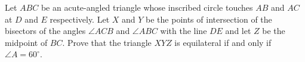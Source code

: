 Let $ABC$ be an acute-angled triangle whose inscribed circle touches $AB$ and $AC$ at $D$ and $E$ respectively. Let $X$ and $Y$ be the points of intersection of the bisectors of the angles $\angle ACB$ and $\angle ABC$ with the line $DE$ and let $Z$ be the midpoint of $BC$. Prove that the triangle $XYZ$ is equilateral if and only if $\angle A = 60^\circ$.